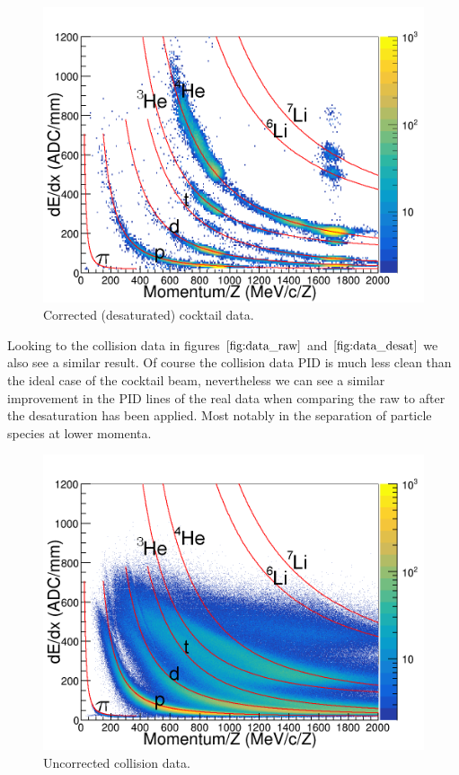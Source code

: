 \documentclass[review]{elsarticle}
\begin{document}
\begin{figure}[H]
\includegraphics[width=\linewidth]{cocktail_desat}
\caption{Corrected (desaturated) cocktail data.}
\label{fig:cocktail_desat}
\end{figure}


 
Looking to the collision data in figures $\ref{fig:data_raw}$ and $\ref{fig:data_desat}$ we also see a similar result. Of course the collision data PID is much less clean than the ideal case of the cocktail beam, nevertheless we can see a similar improvement in the PID lines of the real data when comparing the raw to after the desaturation has been applied. Most notably in the separation of particle species at lower momenta. 

\begin{figure}[H]
\includegraphics[width=\linewidth]{data_raw}
\caption{Uncorrected collision data.}
\label{fig:data_raw}
\end{figure}
\end{document}
